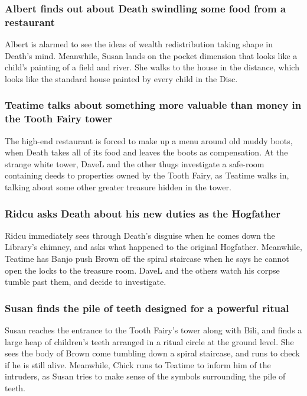 \subsubsection{\Gls{Albert} finds out about \Gls{Death} swindling some food from a restaurant}
\Gls{Albert} is alarmed to see the ideas of wealth redistribution taking shape in \Gls{Death}'s
mind. Meanwhile, \Gls{Susan} lands on the pocket dimension that looks like a child's painting of
a field and river. She walks to the house in the distance, which looks like the standard house
painted by every child in the Disc.

\subsubsection{\Gls{Teatime} talks about something more valuable than money in the Tooth Fairy
    tower}
The high-end restaurant is forced to make up a menu around old muddy boots, when \Gls{Death} takes
all of its food and leaves the boots as compensation. At the strange white tower, \Gls{DaveL} and
the other thugs investigate a safe-room containing deeds to properties owned by the Tooth Fairy,
as \Gls{Teatime} walks in, talking about some other greater treasure hidden in the tower.

\subsubsection{\Gls{Ridcu} asks \Gls{Death} about his new duties as the Hogfather}
\Gls{Ridcu} immediately sees through \Gls{Death}'s disguise when he comes down the Library's
chimney, and asks what happened to the original Hogfather. Meanwhile, \Gls{Teatime} has \Gls{Banjo}
push \Gls{Brown} off the spiral staircase when he says he cannot open the locks to the treasure
room. \Gls{DaveL} and the others watch his corpse tumble past them, and decide to investigate.

\subsubsection{\Gls{Susan} finds the pile of teeth designed for a powerful ritual}
\Gls{Susan} reaches the entrance to the Tooth Fairy's tower along with \Gls{Bili}, and finds a large
heap of children's teeth arranged in a ritual circle at the ground level. She sees the body of
\Gls{Brown} come tumbling down a spiral staircase, and runs to check if he is still alive.
Meanwhile, \Gls{Chick} runs to \Gls{Teatime} to inform him of the intruders, as \Gls{Susan} tries to
make sense of the symbols surrounding the pile of teeth.

